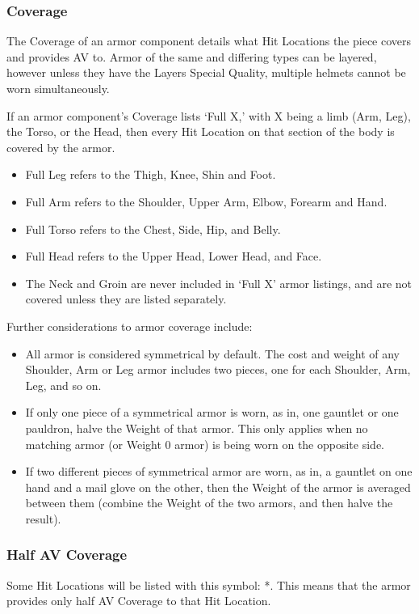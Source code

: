 \documentclass[oneside,11pt,english]{book}
\begin{document}
\subsubsection{Coverage}
The Coverage of an armor component details what Hit Locations the piece covers and provides AV to. Armor of the 
same and differing types can be layered, however unless they have the Layers Special Quality, multiple helmets 
cannot be worn simultaneously.

If an armor component’s Coverage lists ‘Full X,’ with X being a limb (Arm, Leg), the Torso, or the Head, then every 
Hit Location on that section of the body is covered by the armor. 

\begin{itemize}
\item Full Leg refers to the Thigh, Knee, Shin and Foot.
\item Full Arm refers to the Shoulder, Upper Arm, Elbow, Forearm and Hand.
\item Full Torso refers to the Chest, Side, Hip, and Belly.
\item Full Head refers to the Upper Head, Lower Head, and Face.
\item The Neck and Groin are never included in ‘Full X’ armor listings, and are not covered unless they are listed 
  separately.
\end{itemize}

Further considerations to armor coverage include:
\begin{itemize}
\item All armor is considered symmetrical by default. The cost and weight of any Shoulder, Arm or Leg armor 
  includes two pieces, one for each Shoulder, Arm, Leg, and so on.
\item If only one piece of a symmetrical armor is worn, as in, one gauntlet or one pauldron, halve the Weight of 
  that armor. This only applies when no matching armor (or Weight 0 armor) is being worn on the opposite 
  side.
\item If two different pieces of symmetrical armor are worn, as in, a gauntlet on one hand and a mail glove on 
  the other, then the Weight of the armor is averaged between them (combine the Weight of the two armors, and then halve the result).
\end{itemize}

\subsubsection{Half AV Coverage}
Some Hit Locations will be listed with this symbol: *. This means that the armor provides only half AV Coverage to that Hit Location. 
\end{document}
